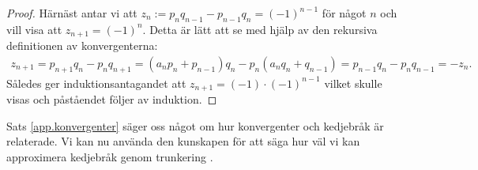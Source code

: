 \begin{proof}
    Härnäst antar vi att \(z_n := p_n q_{n-1} - p_{n-1} q_n = (-1)^{n-1}\) för något $n$ och vill visa att \(z_{n+1} = (-1)^{n}\). Detta är lätt att se med hjälp av den rekursiva definitionen av konvergenterna:
    \begin{align*}
        z_{n+1} = p_{n+1} q_{n} - p_{n} q_{n+1} = (a_n p_n + p_{n-1}) q_n - p_{n} (a_n q_n + q_{n-1}) = p_{n-1} q_n - p_n q_{n-1} = - z_n.
    \end{align*}
    Således ger induktionsantagandet att \(z_{n+1} = (-1) \cdot (-1)^{n-1}\) vilket skulle visas och påståendet följer av induktion. 
\end{proof}

Sats \ref{app.konvergenter} säger oss något om hur konvergenter och kedjebråk är relaterade. Vi kan nu använda den kunskapen för att säga hur väl vi kan approximera kedjebråk genom trunkering \cite[sats 20.9]{Lindahl}.

